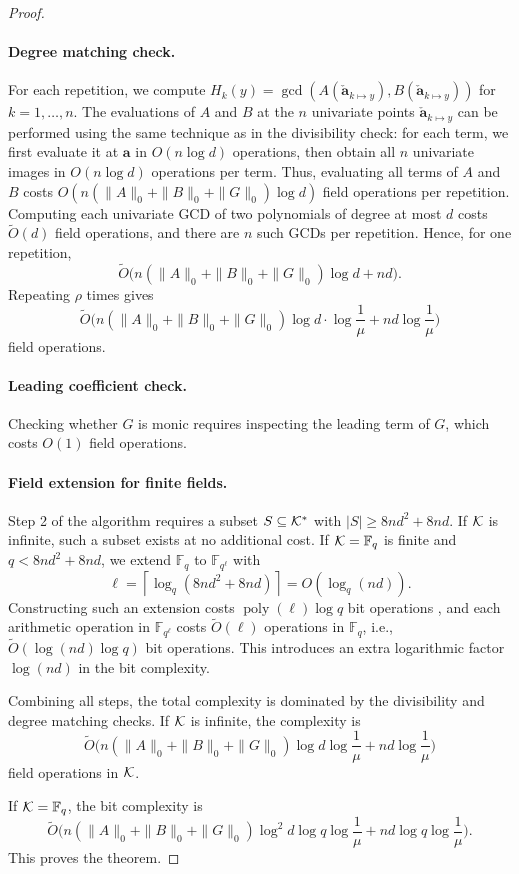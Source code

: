 \documentclass{article}
\numberwithin{equation}{section}
\begin{document}
\begin{proof}
\paragraph{Degree matching check.}
For each repetition, we compute $H_k(y) = \gcd(A(\mathbf{\check{a}}_{k \mapsto y}), B(\mathbf{\check{a}}_{k \mapsto y}))$ for $k = 1,\dots,n$. The evaluations of $A$ and $B$ at the $n$ univariate points $\mathbf{\check{a}}_{k \mapsto y}$ can be performed using the same technique as in the divisibility check: for each term, we first evaluate it at $\mathbf{a}$ in $O(n \log d)$ operations, then obtain all $n$ univariate images in $O(n \log d)$ operations per term. Thus, evaluating all terms of $A$ and $B$ costs $O(n (\|A\|_0 + \|B\|_0 + \|G\|_0) \log d)$ field operations per repetition. Computing each univariate GCD of two polynomials of degree at most $d$ costs $\widetilde{O}(d)$ field operations, and there are $n$ such GCDs per repetition. Hence, for one repetition,
\[
\widetilde{O}\bigl( n (\|A\|_0 + \|B\|_0 + \|G\|_0) \log d + n d \bigr).
\]
Repeating $\rho$ times gives
\[
\widetilde{O}\bigl( n (\|A\|_0 + \|B\|_0 + \|G\|_0) \log d \cdot \log\frac{1}{\mu} + n d \log\frac{1}{\mu} \bigr)
\]
field operations.

\paragraph{Leading coefficient check.}
Checking whether $G$ is monic requires inspecting the leading term of $G$, which costs $O(1)$ field operations.

\paragraph{Field extension for finite fields.}
Step 2 of the algorithm requires a subset $S \subseteq {\mathcal{K}}^*$ with $|S| \ge 8nd^2 + 8nd$. If ${\mathcal{K}}$ is infinite, such a subset exists at no additional cost. If ${\mathcal{K}} = \mathbb{F}_q$ is finite and $q < 8nd^2 + 8nd$, we extend $\mathbb{F}_q$ to $\mathbb{F}_{q^{\ell}}$ with
\[
\ell = \left\lceil \log_q(8nd^2 + 8nd) \right\rceil = O(\log_q(nd)).
\]
Constructing such an extension costs $\operatorname{poly}(\ell)\log q$ bit operations \cite{Shoup1994}, and each arithmetic operation in $\mathbb{F}_{q^{\ell}}$ costs $\widetilde{O}(\ell)$ operations in $\mathbb{F}_q$, i.e., $\widetilde{O}(\log(nd)\log q)$ bit operations. This introduces an extra logarithmic factor $\log(nd)$ in the bit complexity.

Combining all steps, the total complexity is dominated by the divisibility and degree matching checks. If ${\mathcal{K}}$ is infinite, the complexity is
\[
\widetilde{O}\bigl( n (\|A\|_0 + \|B\|_0 + \|G\|_0) \log d \log\frac{1}{\mu} + n d \log\frac{1}{\mu} \bigr)
\]
field operations in ${\mathcal{K}}$.

If ${\mathcal{K}} = \mathbb{F}_q$, the bit complexity is
\[
\widetilde{O}\bigl( n (\|A\|_0 + \|B\|_0 + \|G\|_0) \log^2 d \log q \log\frac{1}{\mu} + n d \log q \log\frac{1}{\mu} \bigr).
\]
%
This proves the theorem.
\end{proof}
\end{document}

